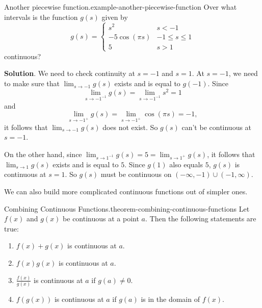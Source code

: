 \documentclass[10pt,]{book}
\numberwithin{equation}{section}
\begin{document}
\begin{example}{Another piecewise function.}{example-another-piecewise-function}%
\hypertarget{p-43}{}%
Over what intervals is the function \(g(s)\) given by%
\begin{equation*}
g(s) = \begin{cases} s^{2} & s<-1 \\ -5\cos (\pi s) & -1\leq s\leq 1 \\ 5 & s> 1 \end{cases}
\end{equation*}
continuous?%
\par\smallskip%
\noindent\textbf{Solution}.\hypertarget{solution-8}{}\quad%
\hypertarget{p-44}{}%
We need to check continuity at \(s=-1\) and \(s=1\). At \(s=-1\), we need to make sure that \(\lim_{s\to -1}g(s)\) exists and is equal to \(g(-1)\). Since%
\begin{equation*}
\lim_{s\to-1^{-1}}g(s) = \lim_{s\to-1^{-1}}s^{2} = 1
\end{equation*}
and%
\begin{equation*}
\lim_{s\to-1^{+}}g(s) = \lim_{s\to-1^{+}}\cos(\pi s) = -1,
\end{equation*}
it follows that \(\lim_{s\to-1}g(s)\) does not exist. So \(g(s)\) can't be continuous at \(s=-1\).%
\par
\hypertarget{p-45}{}%
On the other hand, since \(\lim_{s\to1^{-1}}g(s) = 5 = \lim_{s\to1^{+}}g(s)\), it follows that \(\lim_{s\to1}g(s)\) exists and is equal to \(5\). Since \(g(1)\) also equals \(5\), \(g(s)\) is continuous at \(s=1\). So \(g(s)\) must be continuous on \((-\infty, -1)\cup(-1,\infty)\).%
\end{example}
\hypertarget{p-46}{}%
We can also build more complicated continuous functions out of simpler ones.%
\begin{theorem}{Combining Continuous Functions.}{}{theorem-combining-continuous-functions}%
\hypertarget{p-47}{}%
Let \(f(x)\) and \(g(x)\) be continuous at a point \(a\). Then the following statements are true: \leavevmode%
\begin{enumerate}
\item\hypertarget{li-1}{}\(f(x)+g(x)\) is continuous at \(a\).%
\item\hypertarget{li-2}{}\(f(x)g(x)\) is continuous at \(a\).%
\item\hypertarget{li-3}{}\(\frac{f(x)}{g(x)}\) is continuous at \(a\) if \(g(a)\neq0\).%
\item\hypertarget{li-4}{}\(f(g(x))\) is continuous at \(a\) if \(g(a)\) is in the domain of \(f(x)\).%
\end{enumerate}
%
\end{theorem}
\end{document}
